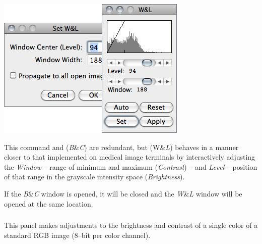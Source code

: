 \begin{minipage}[c][1\totalheight][t]{0.475\columnwidth}%
\includegraphics[scale=0.55]{images/WindowLevel}%
\end{minipage}%
\begin{minipage}[c][1\totalheight][t]{0.525\columnwidth}%
This command and 
(\emph{B}\&\emph{C}) are redundant, but 
(W\&\emph{L}) behaves in a manner closer to that implemented on medical
image terminals by interactively adjusting the \emph{Window} -- range
of minimum and maximum (\emph{Contrast}) -- and \emph{Level} -- position
of that range in the grayscale intensity space (\emph{Brightness}).\medskip{}


If the \emph{B}\&\emph{C} window is opened, it will be closed and
the \emph{W}\&\emph{L} window will be opened at the same location.%
\end{minipage}




\subsubsection{\protect{}\label{sub:Color-Balance...}}

This panel makes adjustments to the brightness and contrast of a single
color of a standard RGB image (8--bit per color
channel). 

